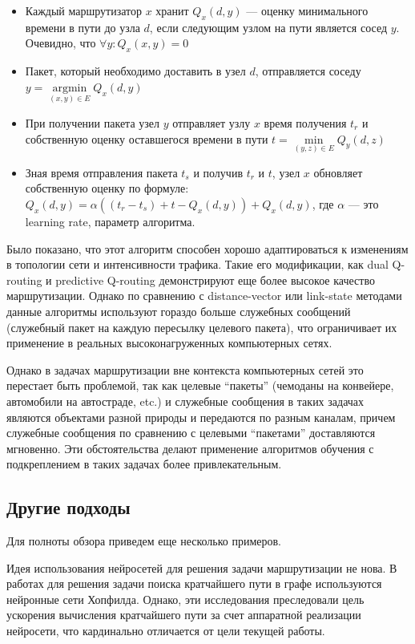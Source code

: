 \documentclass[specification, annotation]{itmo-student-thesis}
\DeclareMathOperator{\argmin}{argmin}
\begin{document}
\begin{itemize}
\item Каждый маршрутизатор $x$ хранит $Q_x(d, y)$ --- оценку минимального
  времени в пути до узла $d$, если следующим узлом на пути является сосед $y$.
  Очевидно, что $\forall y : Q_x(x, y) = 0$ 
\item Пакет, который необходимо доставить в узел $d$, отправляется соседу
  $y = \argmin\limits_{(x, y) \in E} Q_x(d, y)$
\item При получении пакета узел $y$ отправляет узлу $x$ время получения $t_r$ и
  собственную оценку оставшегося времени в пути
  $t = \min\limits_{(y, z) \in E} Q_y(d, z)$
\item Зная время отправления пакета $t_s$ и получив $t_r$ и $t$, узел $x$
  обновляет собственную оценку по формуле:
  $Q_x(d, y) = \alpha((t_r - t_s) + t - Q_x(d, y)) + Q_x(d, y)$,
  где $\alpha$ --- это learning rate, параметр алгоритма.
\end{itemize}

Было показано, что этот алгоритм способен хорошо адаптироваться к изменениям в
топологии сети и интенсивности трафика. Такие его модификации, как dual
Q-routing\cite{dual-q-routing} и predictive Q-routing\cite{predictive-q-routing}
демонстрируют еще более высокое качество маршрутизации. Однако по сравнению с
distance-vector или link-state методами данные алгоритмы используют гораздо
больше служебных сообщений (служебный пакет на каждую пересылку целевого
пакета), что ограничивает их применение в реальных высоконагруженных
компьютерных сетях.

Однако в задачах маршрутизации вне контекста компьютерных сетей это перестает
быть проблемой, так как целевые ``пакеты'' (чемоданы на конвейере, автомобили на
автостраде, etc.) и служебные сообщения в таких задачах являются объектами разной природы и
передаются по разным каналам, причем служебные сообщения по сравнению с целевыми
``пакетами'' доставляются мгновенно. Эти обстоятельства делают применение
алгоритмов обучения с подкреплением в таких задачах более привлекательным.

\subsection{Другие подходы}

Для полноты обзора приведем еще несколько примеров.

Идея использования нейросетей для решения задачи маршрутизации не нова. В
работах \cite{ali-nn-routing, araujo2001neural} для решения задачи поиска кратчайшего пути в графе
используются нейронные сети Хопфилда. Однако, эти исследования преследовали цель
ускорения вычисления кратчайшего пути за счет аппаратной реализации нейросети,
что кардинально отличается от цели текущей работы.
\end{document}
